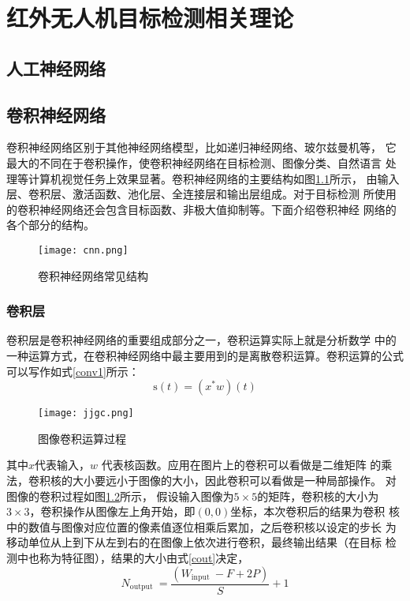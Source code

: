 \chapter{红外无人机目标检测相关理论}

\section{人工神经网络}


\section{卷积神经网络}
卷积神经网络区别于其他神经网络模型，比如递归神经网络、玻尔兹曼机等，
它最大的不同在于卷积操作，使卷积神经网络在目标检测、图像分类、自然语言
处理等计算机视觉任务上效果显著。卷积神经网络的主要结构如图\ref{cnn}所示，
由输入层、卷积层、激活函数、池化层、全连接层和输出层组成。对于目标检测
所使用的卷积神经网络还会包含目标函数、非极大值抑制等。下面介绍卷积神经
网络的各个部分的结构。

\begin{figure}[htbp]
    \centering
    \texttt{[image: cnn.png]}
    \caption{卷积神经网络常见结构}
    \label{cnn}
\end{figure}

\subsection{卷积层}
卷积层是卷积神经网络的重要组成部分之一，卷积运算实际上就是分析数学
中的一种运算方式，在卷积神经网络中最主要用到的是离散卷积运算。卷积运算的公式可以写作如式\ref{conv1}所示：
\begin{equation}
    \mathrm{s}(t)=\left(x^{*} w\right)(t)
    \label{conv1}
\end{equation}

\begin{figure}[htbp]
    \centering
    \texttt{[image: jjgc.png]}
    \caption{图像卷积运算过程}
    \label{jjgc}
\end{figure}

其中$x$代表输入，$w$ 代表核函数。应用在图片上的卷积可以看做是二维矩阵
的乘法，卷积核的大小要远小于图像的大小，因此卷积可以看做是一种局部操作。
对图像的卷积过程如图\ref{jjgc}所示，
假设输入图像为$5\times5$的矩阵，卷积核的大小为
$3\times3$，卷积操作从图像左上角开始，即$(0,0)$坐标，本次卷积后的结果为卷积
核中的数值与图像对应位置的像素值逐位相乘后累加，之后卷积核以设定的步长
为移动单位从上到下从左到右的在图像上依次进行卷积，最终输出结果（在目标
检测中也称为特征图），结果的大小由式\ref{cout}决定，
\begin{equation}
    N_{\text {output }}=\frac{\left(W_{\text {input }}-F+2 P\right)}{S}+1
    \label{cout}
\end{equation}

